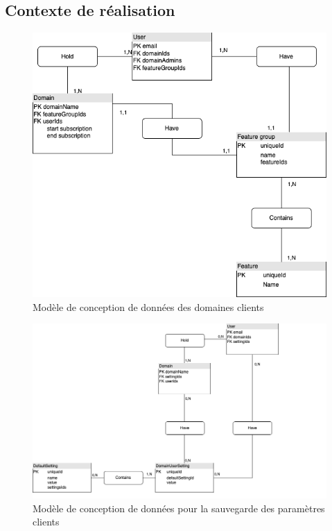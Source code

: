 \documentclass[a4paper, 11pt]{report}
\begin{document}
\subsection{Contexte de réalisation}
  \begin{figure}[h]
      \centering
      \includegraphics[scale=0.40,center]{schemas/features-mcd-ralph2.png}
      \caption{Modèle de conception de données des domaines clients}
  \end{figure}
  \begin{figure}[h]
      \centering
      \includegraphics[scale=0.40,center]{schemas/settings-mcd-kingcandy.png}
      \caption{Modèle de conception de données pour la sauvegarde des paramètres clients}
  \end{figure}
\end{document}
